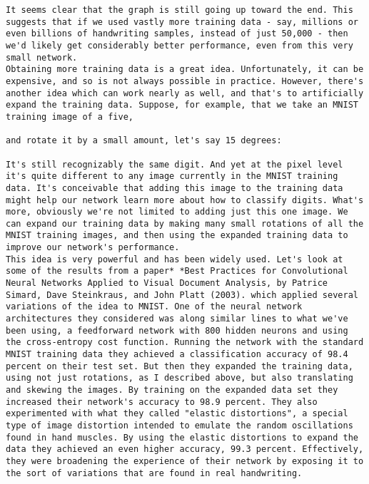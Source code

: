 \begin{lstlisting}
It seems clear that the graph is still going up toward the end. This suggests that if we used vastly more training data - say, millions or even billions of handwriting samples, instead of just 50,000 - then we'd likely get considerably better performance, even from this very small network.
Obtaining more training data is a great idea. Unfortunately, it can be expensive, and so is not always possible in practice. However, there's another idea which can work nearly as well, and that's to artificially expand the training data. Suppose, for example, that we take an MNIST training image of a five,

and rotate it by a small amount, let's say 15 degrees:

It's still recognizably the same digit. And yet at the pixel level it's quite different to any image currently in the MNIST training data. It's conceivable that adding this image to the training data might help our network learn more about how to classify digits. What's more, obviously we're not limited to adding just this one image. We can expand our training data by making many small rotations of all the MNIST training images, and then using the expanded training data to improve our network's performance.
This idea is very powerful and has been widely used. Let's look at some of the results from a paper* *Best Practices for Convolutional Neural Networks Applied to Visual Document Analysis, by Patrice Simard, Dave Steinkraus, and John Platt (2003). which applied several variations of the idea to MNIST. One of the neural network architectures they considered was along similar lines to what we've been using, a feedforward network with 800 hidden neurons and using the cross-entropy cost function. Running the network with the standard MNIST training data they achieved a classification accuracy of 98.4 percent on their test set. But then they expanded the training data, using not just rotations, as I described above, but also translating and skewing the images. By training on the expanded data set they increased their network's accuracy to 98.9 percent. They also experimented with what they called "elastic distortions", a special type of image distortion intended to emulate the random oscillations found in hand muscles. By using the elastic distortions to expand the data they achieved an even higher accuracy, 99.3 percent. Effectively, they were broadening the experience of their network by exposing it to the sort of variations that are found in real handwriting.

\end{lstlisting}
